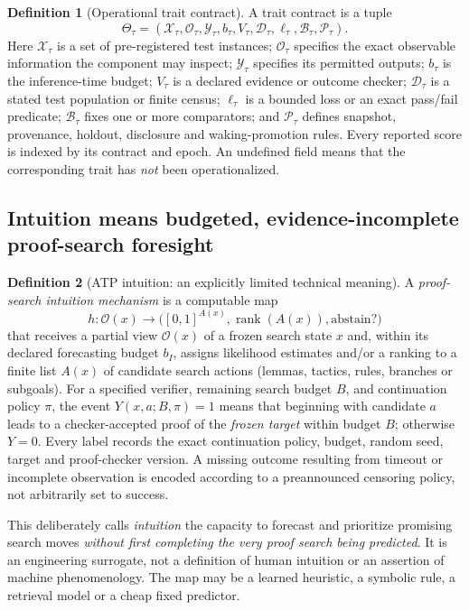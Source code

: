 \documentclass[11pt,letterpaper]{article}
\theoremstyle{definition}
\newtheorem{definition}{Definition}[section]
\theoremstyle{plain}
\theoremstyle{definition}
\begin{document}
\begin{definition}[Operational trait contract]
A trait contract is a tuple
\[
 \Theta_\tau=(\mathcal X_\tau,\mathcal O_\tau,\mathcal Y_\tau,
 b_\tau,V_\tau,\mathcal D_\tau,\ell_\tau,\mathcal B_\tau,
 \mathcal P_\tau).
\]
Here $\mathcal X_\tau$ is a set of pre-registered test instances;
$\mathcal O_\tau$ specifies the exact observable information the component
may inspect; $\mathcal Y_\tau$ specifies its permitted outputs;
$b_\tau$ is the inference-time budget; $V_\tau$ is a declared evidence or
outcome checker; $\mathcal D_\tau$ is a stated test population or finite
census; $\ell_\tau$ is a bounded loss or an exact pass/fail predicate;
$\mathcal B_\tau$ fixes one or more comparators; and $\mathcal P_\tau$ defines
snapshot, provenance, holdout, disclosure and waking-promotion rules.
Every reported score is indexed by its contract and epoch. An undefined field
means that the corresponding trait has \emph{not} been operationalized.
\end{definition}

\subsection{Intuition means budgeted, evidence-incomplete proof-search foresight}
\begin{definition}[ATP intuition: an explicitly limited technical meaning]
A \emph{proof-search intuition mechanism} is a computable map
\[
 h:\mathcal O(x)\longrightarrow
 \bigl([0,1]^{A(x)},\operatorname{rank}(A(x)),\mathrm{abstain?}\bigr)
\]
that receives a partial view $\mathcal O(x)$ of a frozen search state $x$ and,
within its declared forecasting budget $b_I$, assigns likelihood estimates
and/or a ranking to a finite list $A(x)$ of candidate search actions
(lemmas, tactics, rules, branches or subgoals). For a specified verifier,
remaining search budget $B$, and continuation policy $\pi$, the event
$Y(x,a;B,\pi)=1$ means that beginning with candidate $a$ leads to a
checker-accepted proof of the \emph{frozen target} within budget $B$;
otherwise $Y=0$. Every label records the exact continuation policy, budget,
random seed, target and proof-checker version. A missing outcome resulting
from timeout or incomplete observation is encoded according to a
preannounced censoring policy, not arbitrarily set to success.

This deliberately calls \emph{intuition} the capacity to forecast and prioritize
promising search moves \emph{without first completing the very proof search
being predicted}. It is an engineering surrogate, not a definition of human
intuition or an assertion of machine phenomenology. The map may be a learned
heuristic, a symbolic rule, a retrieval model or a cheap fixed predictor.
\end{definition}
\end{document}
